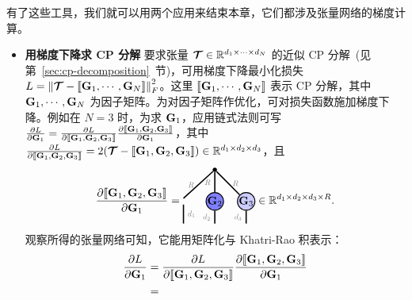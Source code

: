 有了这些工具，我们就可以用两个应用来结束本章，它们都涉及张量网络的梯度计算。 
\begin{itemize}
\item\textbf{用梯度下降求 CP 分解} 要求张量 $\bm{\mathcal{T}}\in\mathbb{R}^{d_1\times\cdots\times d_N}$ 的近似 CP 分解~(见第~\ref{sec:cp-decomposition}~节)，可用梯度下降最小化损失 $L = \left\lVert\bm{\mathcal{T}}-\llbracket \mathbf{G}_1,\cdots,\mathbf{G}_N \rrbracket\right\rVert^2_F$。这里 $\llbracket \mathbf{G}_1,\cdots,\mathbf{G}_N \rrbracket$ 表示 CP 分解，其中 $\mathbf{G}_1,\cdots,\mathbf{G}_N$ 为因子矩阵。为对因子矩阵作优化，可对损失函数施加梯度下降。例如在 $N=3$ 时，为求 $\mathbf{G}_1$，应用链式法则可写 $\frac{\partial L}{\partial\mathbf{G}_1} = \frac{\partial L}{\partial\llbracket \mathbf{G}_1,\mathbf{G}_2,\mathbf{G}_3 \rrbracket}\frac{\partial\llbracket \mathbf{G}_1,\mathbf{G}_2,\mathbf{G}_3 \rrbracket}{\partial\mathbf{G}_1}$，其中 $\frac{\partial L}{\partial\llbracket \mathbf{G}_1,\mathbf{G}_2,\mathbf{G}_3 \rrbracket}= 2(\bm{\mathcal{T}}-\llbracket \mathbf{G}_1,\mathbf{G}_2,\mathbf{G}_3 \rrbracket)\in\mathbb{R}^{d_1\times d_2\times d_3}$，且 
\begin{align*}
\frac{\partial\CP{\Gb_1,\Gb_2,\Gb_3}}{\partial\Gb_1}
=
\begin{tikzpicture}[baseline=\baseline]
    \tikzset{tensor/.style = {minimum size = 0.5cm,shape = circle,thick,draw=black,inner sep = 0pt}, edge/.style   = {thick,line width=.4mm},every loop/.style={}}
    \def\y{0}
    \def\x{0}
 \node[tensor,fill=blue!50!white] (G2) at (\x+1,\y){$\Gb_2$};
   \node[tensor,fill=blue!20!white] (G3) at (\x+2,\y){$\Gb_3$};
    \draw  node[fill = black,circle,inner sep=0pt,minimum size=4pt] (m) at (\x+1,\y+1) {};
    \draw[edge] (m) -- (\x,\y+0.1) node [midway,left] {\edgelabel{$R$}};
    \draw[edge] (G2) -- (m)node [midway,left] {\edgelabel{$R$}};
    \draw[edge] (G3) -- (m)node [midway,right] {\edgelabel{$R$}};
    \draw[edge](\x,\y-0.1) -- (\x,\y-0.7) node [midway,right] {\edgelabel{$d_1$}};
    \draw[edge](G2) -- (\x+1,\y-0.7)node [midway,left] {\edgelabel{$d_2$}};
    \draw[edge](G3) -- (\x+2,\y-0.7) node [midway,left] {\edgelabel{$d_3$}};
\end{tikzpicture}\in\RR^{d_1\times d_2\times d_3\times R}.
\end{align*}
观察所得的张量网络可知，它能用矩阵化与 Khatri-Rao 积表示：
\begin{align*}
  \frac{\partial L}{\partial\Gb_1} 
&=
\frac{\partial L}{\partial\CP{\Gb_1,\Gb_2,\Gb_3}}\frac{\partial\CP{\Gb_1,\Gb_2,\Gb_3}}{\partial\Gb_1}\\
&=
\begin{tikzpicture}[baseline=-0.5ex]
    \tikzset{tensor1/.style = {minimum width = 3cm,minimum height = 0.6cm,shape = rounded rectangle,thick,draw=black,inner sep = 0pt}, edge/.style = {thick,line width=.4mm},every loop/.style={}}
     \tikzset{tensor2/.style = {minimum size = 0.5cm,shape = circle,thick,draw=black,inner sep = 0pt}, edge/.style   = {thick,line width=.4mm},every loop/.style={}}

\end{tikzpicture}
\end{align*}
\end{itemize}
